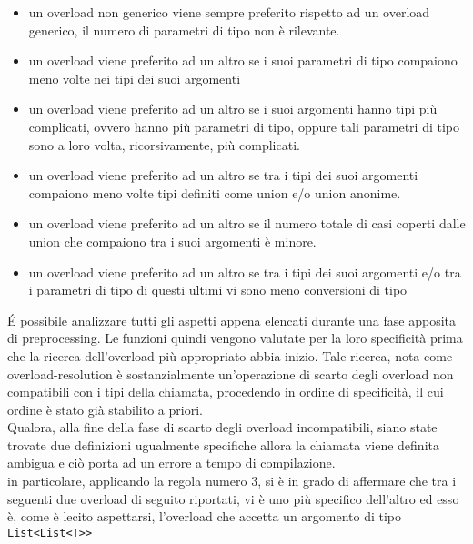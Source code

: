 \begin{itemize}
    \item{
        un overload non generico viene sempre preferito rispetto ad un overload generico, il 
        numero di parametri di tipo non è rilevante.
    }
    \item{
        un overload viene preferito ad un altro se i suoi parametri di tipo compaiono 
        meno volte nei tipi dei suoi argomenti
    }
    \item{
        un overload viene preferito ad un altro se i suoi argomenti hanno tipi più complicati, 
        ovvero hanno più parametri di tipo, oppure tali parametri di tipo sono a loro volta, 
        ricorsivamente, più complicati. 
    }
    \item{
        un overload viene preferito ad un altro se tra i tipi dei suoi argomenti 
        compaiono meno volte tipi definiti come union e/o union anonime.
    }
    \item{
        un overload viene preferito ad un altro se il numero totale di casi coperti dalle 
        union che compaiono tra i suoi argomenti è minore.
    }
    \item{
        un overload viene preferito ad un altro se tra i tipi dei suoi argomenti e/o tra i 
        parametri di tipo di questi ultimi vi sono meno conversioni di tipo
    }
\end{itemize}

É possibile analizzare tutti gli aspetti appena elencati durante una fase apposita 
di preprocessing. Le funzioni quindi vengono valutate per la loro specificità 
prima che la ricerca dell’overload più appropriato abbia inizio. Tale ricerca, 
nota come overload-resolution è sostanzialmente un’operazione di scarto degli 
overload non compatibili con i tipi della chiamata, procedendo in ordine di specificità, 
il cui ordine è stato già stabilito a priori. \\

Qualora, alla fine della fase di scarto 
degli overload incompatibili, siano state trovate due definizioni ugualmente specifiche 
allora la chiamata viene definita ambigua e ciò porta ad un errore a tempo di compilazione. \\

in particolare, applicando la regola numero 3, si è in grado di affermare 
che tra i seguenti due overload di seguito riportati, vi è uno più specifico 
dell’altro ed esso è, come è lecito aspettarsi, l’overload che 
accetta un argomento di tipo \texttt{List<List<T>\>>}

